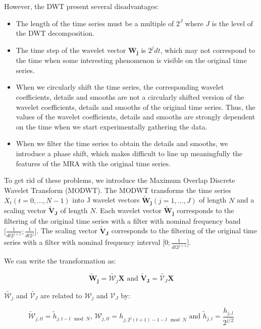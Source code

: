 \documentclass[main.tex]{subfiles}
\begin{document}
However, the DWT present several disadvantages:

\begin{itemize}
	\item The length of the time series must be a multiple of $2^J$ where $J$ is the level of the DWT decomposition.
	\item The time step of the wavelet vector $\bm{W_j}$ is $2^j dt$, which may not correspond to the time when some interesting phenomenon is visible on the original time series.
	\item When we circularly shift the time series, the corresponding wavelet coefficients, details and smooths are not a circularly shifted version of the wavelet coefficients, details and smooths of the original time series. Thus, the values of the wavelet coefficients, details and smooths are strongly dependent on the time when we start experimentally gathering the data.
	\item When we filter the time series to obtain the details and smooths, we introduce a phase shift, which makes difficult to line up meaningfully the features of the MRA with the original time series.
\end{itemize}

To get rid of these problems, we introduce the Maximum Overlap Discrete Wavelet Transform (MODWT). The MODWT transforms the time series $X_t \left( t = 0, ... , N - 1 \right)$ into J wavelet vectors $\bm{\widetilde{W}_j} \left( j = 1 , ... , J \right)$ of length $N$ and a scaling vector $\bm{\widetilde{V}_J}$ of length $N$. Each wavelet vector $\bm{\widetilde{W}_j}$ corresponds to the filtering of the original time series with a filter with nominal frequency band $\lbrack \frac{1}{dt 2^{j + 1}} ; \frac{1}{dt 2^j} \rbrack$. The scaling vector $\bm{\widetilde{V}_J}$ corresponds to the filtering of the original time series with a filter with nominal frequency interval $\lbrack 0 ; \frac{1}{dt 2^{j + 1}} \rbrack$.

We can write the transformation as:

\begin{equation}
\bm{\widetilde{W}_j} = \widetilde{\mathcal{W}_j} \bm{X} \text{ and } \bm{\widetilde{V}_J} = \widetilde{\mathcal{V}_J} \bm{X}
\end{equation}

$ \widetilde{\mathcal{W}_j}$ and $\widetilde{\mathcal{V}_J}$ are related to $\mathcal{W}_j$ and $\mathcal{V}_J$ by:

\begin{equation}
\widetilde{\mathcal{W}}_{j, t l} = \widetilde{h}_{j , t - l \mod N} \text{, } \mathcal{W}_{j, t l} = h_{j , 2^j \left( t + 1 \right) - 1 - l \mod N} \text{ and } \widetilde{h}_{j , l} = \frac{h_{j , l}}{2^{j/2}}
\end{equation}
\end{document}
